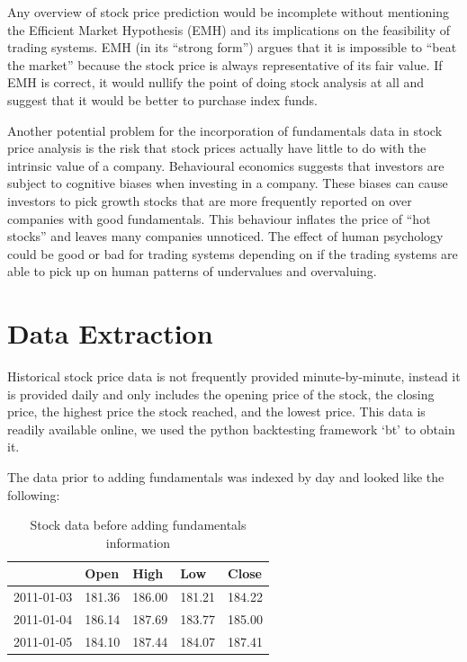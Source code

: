 \documentclass{article}
\begin{document}
Any overview of stock price prediction would be incomplete without mentioning the Efficient Market Hypothesis (EMH)\cite{malkiel_2003} and its implications on the feasibility of trading systems. EMH (in its “strong form”) argues that it is impossible to “beat the market” because the stock price is always representative of its fair value. If EMH is correct, it would nullify the point of doing stock analysis at all and suggest that it would be better to purchase index funds. 

Another potential problem for the incorporation of fundamentals data in stock price analysis is the risk that stock prices actually have little to do with the intrinsic value of a company. Behavioural economics suggests that investors are subject to  cognitive biases when investing in a company. These biases can cause investors to pick growth stocks that are more frequently reported on over companies with good fundamentals. This behaviour inflates the price of “hot stocks” and leaves many companies unnoticed. The effect of human psychology could be good or bad for trading systems depending on if the trading systems are able to pick up on human patterns of undervalues and overvaluing. 

\section{Data Extraction}
\label{sec:data_extraction}

Historical stock price data is not frequently provided minute-by-minute, instead it is provided daily and only includes the opening price of the stock, the closing price, the highest price the stock reached, and the lowest price. This data is readily available online, we used the python backtesting framework ‘bt’ to obtain it. 

The data prior to adding fundamentals was indexed by day and looked like the following:
\begin{table}[H]
\centering
\begin{tabular}{|l|l|l|l|l|}
\hline
 & Open & High & Low & Close \\ \hline
2011-01-03 & 181.36 & 186.00 & 181.21 & 184.22\\ \hline
2011-01-04 & 186.14 & 187.69 & 183.77 & 185.00 \\ \hline
2011-01-05 & 184.10 & 187.44 & 184.07 & 187.41\\ \hline
\end{tabular}
\caption{Stock data before adding fundamentals information}
\label{my-label}
\end{table}
\end{document}
